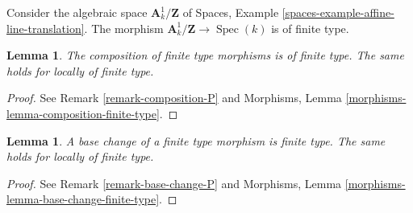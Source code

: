 \documentclass{stacks-project}
\theoremstyle{plain}
\newtheorem{lemma}[subsection]{Lemma}
\theoremstyle{definition}
\theoremstyle{remark}
\numberwithin{equation}{subsection}
\def\Spec{\mathop{\mathrm{Spec}}}
\begin{document}
\noindent
Consider the algebraic space $\mathbf{A}^1_k/\mathbf{Z}$ of
Spaces, Example \ref{spaces-example-affine-line-translation}.
The morphism $\mathbf{A}^1_k/\mathbf{Z} \to \Spec(k)$
is of finite type.

\begin{lemma}
\label{lemma-composition-finite-type}
The composition of finite type morphisms is of finite type.
The same holds for locally of finite type.
\end{lemma}

\begin{proof}
See Remark \ref{remark-composition-P} and
Morphisms, Lemma \ref{morphisms-lemma-composition-finite-type}.
\end{proof}

\begin{lemma}
\label{lemma-base-change-finite-type}
A base change of a finite type morphism is finite type.
The same holds for locally of finite type.
\end{lemma}

\begin{proof}
See Remark \ref{remark-base-change-P} and
Morphisms, Lemma \ref{morphisms-lemma-base-change-finite-type}.
\end{proof}
\end{document}
